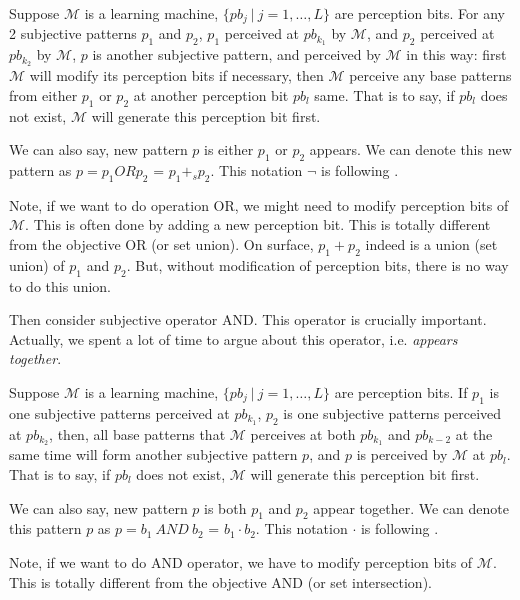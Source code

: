 \begin{definition}
Suppose $\mathcal{M}$ is a learning machine, $\{pb_j \ |\ j = 1, \ldots, L\}$ are perception bits. For any 2 subjective patterns $p_1$ and $p_2$, $p_1$ perceived at $pb_{k_1}$ by $\mathcal{M}$, and $p_2$ perceived at $pb_{k_2}$ by $\mathcal{M}$, $p$ is another subjective pattern, and perceived by $\mathcal{M}$ in this way: first $\mathcal{M}$ will modify its perception bits if necessary, then $\mathcal{M}$ perceive any base patterns from either $p_1$ or $p_2$ at another perception bit $pb_l$ same. That is to say, if $pb_l$ does not exist, $\mathcal{M}$ will generate this perception bit first.
\end{definition} 
We can also say, new pattern $p$ is either $p_1$ or $p_2$ appears. We can denote this new pattern as $p = p_1 OR p_2$ = $p_1 +_s p_2$. This notation $\neg$ is following \cite{valiant}.

Note, if we want to do operation OR, we might need to modify perception bits of $\mathcal{M}$. This is often done by adding a new perception bit. This is totally different from the objective OR (or set union). On surface, $p_1 + p_2$ indeed is a union (set union) of $p_1$ and $p_2$. But, without modification of perception bits, there is no way to do this union.   




Then consider subjective operator AND. This operator is crucially important. Actually, we spent a lot of time to argue about this operator, i.e. {\it appears together}. 


\begin{definition}
Suppose $\mathcal{M}$ is a learning machine, $\{pb_j \ |\ j = 1, \ldots, L\}$ are perception bits. If  $p_1$ is one subjective patterns perceived at $pb_{k_1}$, $p_2$  is one subjective patterns perceived at $pb_{k_2}$, then, all base patterns that $\mathcal{M}$ perceives at both $pb_{k_1}$ and $pb_{k-2}$ at the same time will form another subjective pattern $p$, and $p$ is perceived by $\mathcal{M}$ at $pb_l$. That is to say, if $pb_l$ does not exist, $\mathcal{M}$ will generate this perception bit first.
\end{definition}
We can also say, new pattern $p$ is both $p_1$ and $p_2$ appear together. We can denote this pattern $p$ as $p = b_1 \ AND \ b_2$ = $b_1 \cdot b_2$. This notation $\cdot$ is following \cite{valiant}.

Note, if we want to do AND operator, we have to modify perception bits of $\mathcal{M}$. This is totally different from the objective AND (or set intersection). 
\bigskip





